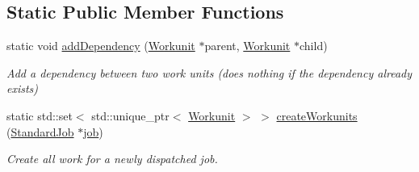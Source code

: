 \subsection*{Static Public Member Functions}
\begin{DoxyCompactItemize}
\item 
static void \hyperlink{classwrench_1_1_workunit_a7c9db9b0a53c44844bb7ee2c761eed47}{add\+Dependency} (\hyperlink{classwrench_1_1_workunit}{Workunit} $\ast$parent, \hyperlink{classwrench_1_1_workunit}{Workunit} $\ast$child)
\begin{DoxyCompactList}\small\item\em Add a dependency between two work units (does nothing if the dependency already exists) \end{DoxyCompactList}\item 
static std\+::set$<$ std\+::unique\+\_\+ptr$<$ \hyperlink{classwrench_1_1_workunit}{Workunit} $>$ $>$ \hyperlink{classwrench_1_1_workunit_ad48a60254d823c530273f793611bdfc2}{create\+Workunits} (\hyperlink{classwrench_1_1_standard_job}{Standard\+Job} $\ast$\hyperlink{classwrench_1_1_workunit_a2264928b16909aad8408251ce44cafb7}{job})
\begin{DoxyCompactList}\small\item\em Create all work for a newly dispatched job. \end{DoxyCompactList}\end{DoxyCompactItemize}
